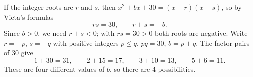 If the integer roots are $r$ and $s$, then $x^2+bx+30=(x-r)(x-s)$, so by Vieta's formulas
\[
rs=30,\qquad r+s=-b .
\]
Since $b>0$, we need $r+s<0$; with $rs=30>0$ both roots are negative. Write $r=-p$, $s=-q$ with positive integers $p\le q$, $pq=30$, $b=p+q$. The factor pairs of $30$ give
\[
1+30=31,\qquad 2+15=17,\qquad 3+10=13,\qquad 5+6=11 .
\]
These are four different values of $b$, so there are $\boxed{4}$ possibilities.

